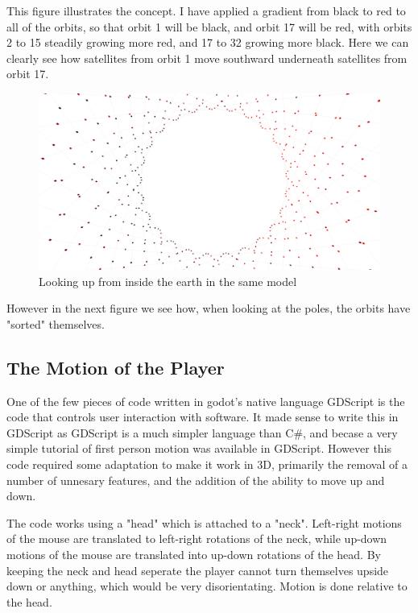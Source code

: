 \documentclass[12pt]{article}
\begin{document}
This figure illustrates the concept. I have applied a gradient from black to red to all of the orbits, so that orbit 1 will be black, and orbit 17 will be red, with orbits 2 to 15 steadily growing more red, and 17 to 32 growing more black. Here we can clearly see how satellites from orbit 1 move southward underneath satellites from orbit 17.

\begin{figure}
\label{Looking up at Upward and Downward Satellites}
\caption{Looking up from inside the earth in the same model}
\includegraphics[width=\textwidth]{LookingUpAtUpwardAndDownwardSatellites}
\end{figure}

However in the next figure we see how, when looking at the poles, the orbits have "sorted" themselves.


\subsection{The Motion of the Player}

One of the few pieces of code written in godot's native language GDScript is the code that controls user interaction with software. It made sense to write this in GDScript as GDScript is a much simpler language than C\#, and becase a very simple tutorial of first person motion was available in GDScript\cite{FirstPersonMotion}. However this code required some adaptation to make it work in 3D, primarily the removal of a number of unnesary features, and the addition of the ability to move up and down.

The code works using a "head" which is attached to a "neck". Left-right motions of the mouse are translated to left-right rotations of the neck, while up-down motions of the mouse are translated into up-down rotations of the head. By keeping the neck and head seperate the player cannot turn themselves upside down or anything, which would be very disorientating. Motion is done relative to the head.
\end{document}
